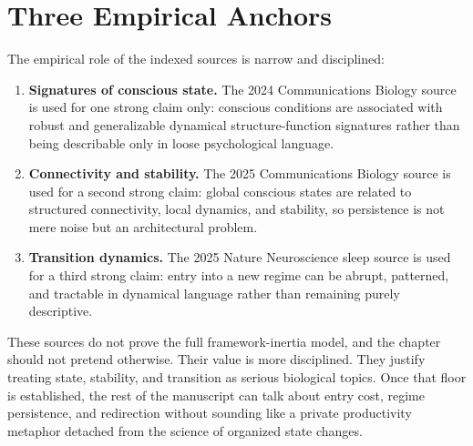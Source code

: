 \section{Three Empirical Anchors}

The empirical role of the indexed sources is narrow and disciplined:
\begin{enumerate}[nosep]
  \item \textbf{Signatures of conscious state.} The 2024 Communications
        Biology source is used for one strong claim only: conscious conditions
        are associated with robust and generalizable dynamical
        structure-function signatures rather than being describable only in
        loose psychological language.
  \item \textbf{Connectivity and stability.} The 2025 Communications Biology
        source is used for a second strong claim: global conscious states are
        related to structured connectivity, local dynamics, and stability, so
        persistence is not mere noise but an architectural problem.
  \item \textbf{Transition dynamics.} The 2025 Nature Neuroscience sleep
        source is used for a third strong claim: entry into a new regime can
        be abrupt, patterned, and tractable in dynamical language rather than
        remaining purely descriptive.
\end{enumerate}

\begin{discussion}
These sources do not prove the full framework-inertia model, and the chapter
should not pretend otherwise. Their value is more disciplined. They justify
treating state, stability, and transition as serious biological topics. Once
that floor is established, the rest of the manuscript can talk about entry
cost, regime persistence, and redirection without sounding like a private
productivity metaphor detached from the science of organized state changes.
\end{discussion}
